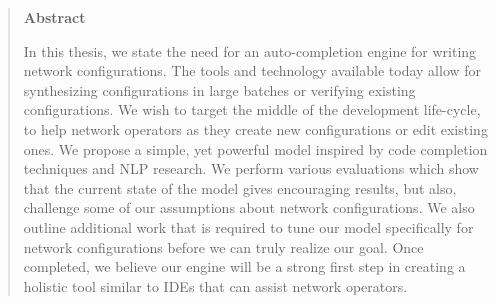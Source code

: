 \begin{quote}
\begin{center}{\bf \large Abstract}\end{center}
In this thesis, we state the need for an auto-completion engine for writing network configurations. The tools and technology available today allow for synthesizing configurations in large batches or verifying existing configurations. We wish to target the middle of the development life-cycle, to help network operators as they create new configurations or edit existing ones. We propose a simple, yet powerful model inspired by code completion techniques and NLP research. We perform various evaluations which show that the current state of the model gives encouraging results, but also, challenge some of our assumptions about network configurations. We also outline additional work that is required to tune our model specifically for network configurations before we can truly realize our goal. Once completed, we believe our engine will be a strong first step in creating a holistic tool similar to IDEs that can assist network operators. 
\end{quote}
